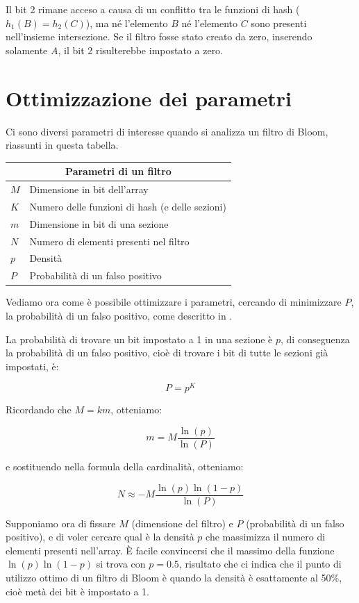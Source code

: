 Il bit 2 rimane acceso a causa di un conflitto tra le funzioni di hash ($h_1(B) = h_2(C)$), ma
né l'elemento $B$ né l'elemento $C$ sono presenti nell'insieme intersezione. Se il filtro fosse
stato creato da zero, inserendo solamente $A$, il bit 2 risulterebbe impostato a zero.

\section{Ottimizzazione dei parametri}
\label{sec:bloomparms}

Ci sono diversi parametri di interesse quando si analizza un filtro di Bloom, riassunti in questa
tabella.

\medskip
\begin{tabular}{ |l|l| }
  \multicolumn{2}{c}{Parametri di un filtro} \\
  \hline
  $M$ & Dimensione in bit dell'array \\
  $K$ & Numero delle funzioni di hash (e delle sezioni) \\
  $m$ & Dimensione in bit di una sezione \\
  $N$ & Numero di elementi presenti nel filtro \\
  $p$ & Densità \\
  $P$ & Probabilità di un falso positivo \\
  \hline
\end{tabular}

\medskip

Vediamo ora come è possibile ottimizzare i parametri, cercando di minimizzare $P$, la probabilità
di un falso positivo, come descritto in \cite{bloom-scalable}.

La probabilità di trovare un bit impostato a 1 in una sezione è $p$, di conseguenza la probabilità 
di un falso positivo, cioè di trovare i bit di tutte le sezioni già impostati, è:

$$ P = p^K $$

Ricordando che $M=km$, otteniamo:

$$ m = M\frac{\ln(p)}{\ln(P)} $$

e sostituendo nella formula della cardinalità, otteniamo:

$$ N \approx -M\frac{\ln(p)\ln(1-p)}{\ln(P)} $$

Supponiamo ora di fissare $M$ (dimensione del filtro) e $P$ (probabilità di un falso positivo), e di
voler cercare qual è la densità $p$ che massimizza il numero di elementi presenti nell'array. È
facile convincersi che il massimo della funzione $\ln(p)\ln(1-p)$ si trova con $p=0.5$, risultato
che ci indica che il punto di utilizzo ottimo di un filtro di Bloom è quando la densità è
esattamente al 50\%, cioè metà dei bit è impostato a 1.

